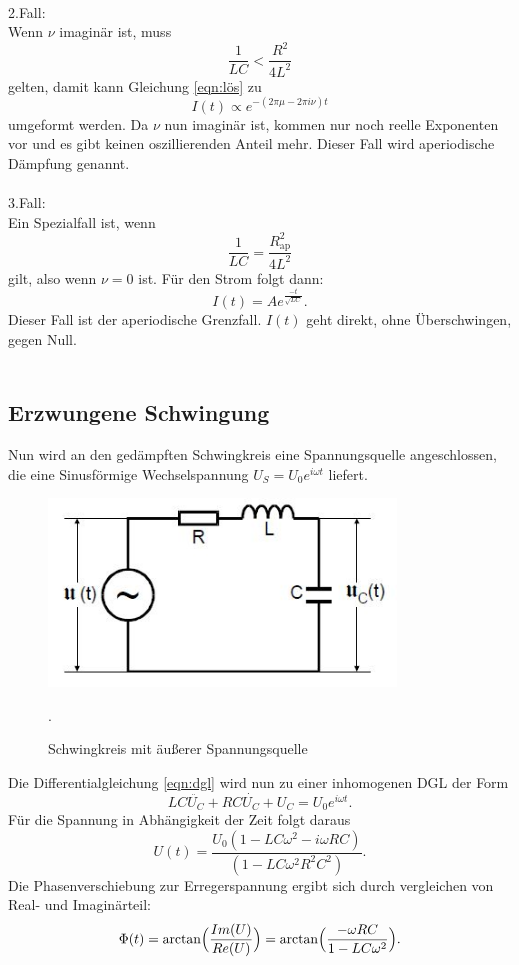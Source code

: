 \\
2.Fall:\\
Wenn $\nu$ imaginär ist, muss
\begin{equation}
  \frac{1}{LC}<\frac{R^2}{4L^2}
  \label{bed2}
\end{equation}
gelten, damit kann Gleichung \ref{eqn:lös} zu
\begin{equation}
  I(t) \propto e^{-(2\pi \mu -2\pi i \nu)t}
\end{equation}
umgeformt werden. Da $\nu$ nun imaginär ist, kommen nur noch
reelle Exponenten vor und es gibt keinen oszillierenden Anteil mehr.
Dieser Fall wird aperiodische Dämpfung genannt.\\
\\
3.Fall:\\
Ein Spezialfall ist, wenn
\begin{equation}
  \frac{1}{LC}= \frac{R_{\text{ap}}^2}{4L^2}
  \label{eqn:bed3}
\end{equation}
gilt, also wenn $\nu=0$ ist.
Für den Strom folgt dann:
\begin{equation}
  I(t)=Ae^{\frac{-t}{\sqrt{LC}}}.
\end{equation}
Dieser Fall ist der aperiodische Grenzfall. $I(t)$ geht direkt, ohne
Überschwingen, gegen Null.\\
\\

\subsection{Erzwungene Schwingung}
Nun wird an den gedämpften Schwingkreis eine Spannungsquelle angeschlossen, die
eine Sinusförmige Wechselspannung $U_{S}=U_{0}e^{i\omega t}$ liefert.
\begin{figure}[H]
  \centering
  \includegraphics[height=5cm]{erzw.JPG}
  \caption{Schwingkreis mit äußerer Spannungsquelle}
  \cite{skript}.
  \label{fig:erzw}
\end{figure}
Die Differentialgleichung \ref{eqn:dgl} wird nun zu einer inhomogenen DGL der Form
\begin{equation}
  LC\ddot{U_{C}}+ RC\dot{U_{C}}+U_{C}=U_{0}e^{i\omega t}.
  \label{eqn:erzwdgl}
\end{equation}
Für die Spannung in Abhängigkeit der Zeit folgt daraus
\begin{equation}
  U(t)=\frac{U_{0}(1-LC\omega^2-i\omega RC)}{(1-LC\omega^2R^2C^2)}.
\end{equation}
Die Phasenverschiebung zur Erregerspannung ergibt sich durch vergleichen von
Real- und Imaginärteil:
\begin{equation}
  \Phi(t)=\arctan\Bigl(\frac{Im(U)}{Re(U)}\Bigr)=\arctan\Bigl(\frac{-\omega RC}{1-LC\omega^2}\Bigr).
\end{equation}

